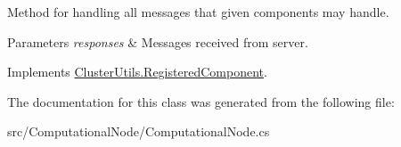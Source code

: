 Method for handling all messages that given components may handle. 


\begin{DoxyParams}{Parameters}
{\em responses} & Messages received from server.\\
\hline
\end{DoxyParams}


Implements \hyperlink{class_cluster_utils_1_1_registered_component_ad5ea6fe7d138e7c6bb457c7dca203040}{Cluster\+Utils.\+Registered\+Component}.



The documentation for this class was generated from the following file\+:\begin{DoxyCompactItemize}
\item 
src/\+Computational\+Node/Computational\+Node.\+cs\end{DoxyCompactItemize}
